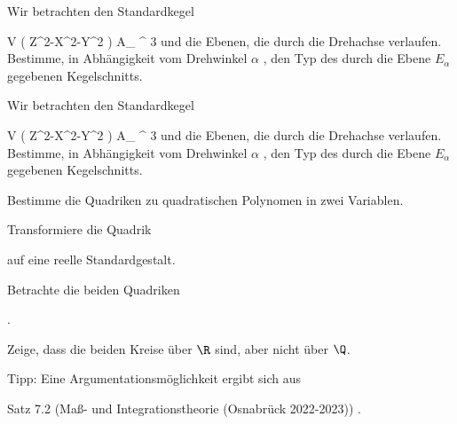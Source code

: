 {}
{





Wir betrachten den Standardkegel

\mavergleichskette
{\vergleichskette
{ V \left(  Z^2-X^2-Y^2  \right)
}
{ \subset }{ { {\mathbb A}_{  \R  }^{  3   } }
}
{  }{
}
{    }{
}
{   }{
}
}
{}{}{}
und die Ebenen, die durch die Drehachse
 verlaufen. Bestimme, in Abhängigkeit vom Drehwinkel $\alpha$
 {} {,}
den Typ des durch die Ebene $E_\alpha$ gegebenen Kegelschnitts.





}
{} {}

{}
{





Wir betrachten den Standardkegel

\mavergleichskette
{\vergleichskette
{ V \left(  Z^2-X^2-Y^2  \right)
}
{ \subset }{ { {\mathbb A}_{  \R  }^{  3   } }
}
{  }{
}
{    }{
}
{   }{
}
}
{}{}{}
und die Ebenen, die durch die Drehachse
 verlaufen. Bestimme, in Abhängigkeit vom Drehwinkel $\alpha$
 {} {,}
den Typ des durch die Ebene $E_\alpha$ gegebenen Kegelschnitts.





}
{} {}

{}
{





Bestimme die Quadriken zu
quadratischen Polynomen in zwei Variablen.





}
{} {}

{}
{





Transformiere die Quadrik

 {  }

auf eine reelle Standardgestalt.





}
{} {}

{}
{





Betrachte die beiden Quadriken

 { . }

Zeige, dass die beiden Kreise über $\R$
sind, aber nicht über $\Q$.





}
{} {Tipp: Eine Argumentationsmöglichkeit ergibt sich aus

Satz 7.2 (Maß- und Integrationstheorie (Osnabrück 2022-2023))
.}

